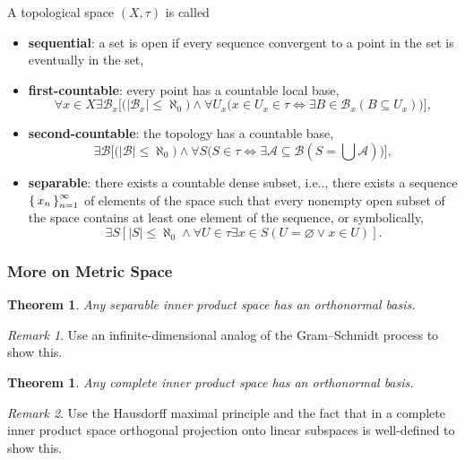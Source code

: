 \documentclass[12pt, letterpaper]{article}
\makeatletter
\newcommand\ie{i.e\@ifnextchar.{}{.\@}}
\newcommand{\card}[1]{\left\lvert #1 \right\rvert}
\renewcommand{\emptyset}{\varnothing}
\newtheorem{thm}[prop]{Theorem}
\theoremstyle{definition}
\theoremstyle{remark}
\newtheorem*{rem*}{Remark}
\theoremstyle{definition}
\theoremstyle{plain}
\numberwithin{equation}{section}
\makeatother
\begin{document}
	\begin{def*}
		A topological space $(X,\tau)$ is called 
		\begin{itemize}
			\item \textbf{sequential}: a set is open if every sequence convergent to a point in the set is eventually in the set,
			\item \textbf{first-countable}: every point has a countable local base,
			\[ \forall x\in X\exists \mathcal{B}_x \Big[\big(\card{\mathcal{B}_x}\le\aleph_0\big)\land \forall U_x \big(x\in U_x\in\tau \iff \exists B\in\mathcal{B}_x (B\subseteq U_x)\big) \Big]  ,\]
			
			\item \textbf{second-countable}: the topology has a countable base,
			\[\exists \mathcal{B}\Big[\big( \card{\mathcal{B}}\le\aleph_0 \big)
			\land \forall S \big(S\in\tau\iff \exists \mathcal{A}\subseteq \mathcal{B} ( S=\bigcup \mathcal{A})\big)\Big],\]
			
			\item \textbf{separable}: there exists a countable dense subset, \ie,
			there exists a sequence $\set{ x_n }_{n=1}^{\infty}$ of elements of the space
			such that every nonempty open subset of the space contains at least one element of the sequence,
			or symbolically,
			\[ \exists S [\card{S}\le \aleph_0 \land \forall U\in \tau\exists x\in S(U=\emptyset \lor x\in U) ]. \]
		\end{itemize}
	\end{def*}
	
	
	\subsubsection{More on Metric Space}
	
	\begin{thm}
		Any separable inner product space has an orthonormal basis.
	\end{thm}
	\begin{rem*}
		Use an infinite-dimensional analog of the Gram--Schmidt process to show this.
	\end{rem*}
	
	\begin{thm}\label{thmHilbertOrthonormal}
		Any complete inner product space has an orthonormal basis.
	\end{thm}
	\begin{rem*}
		Use the Hausdorff maximal principle and the fact that in a complete inner product space orthogonal projection
		onto linear subspaces is well-defined to show this.
	\end{rem*}
	
\end{document}
